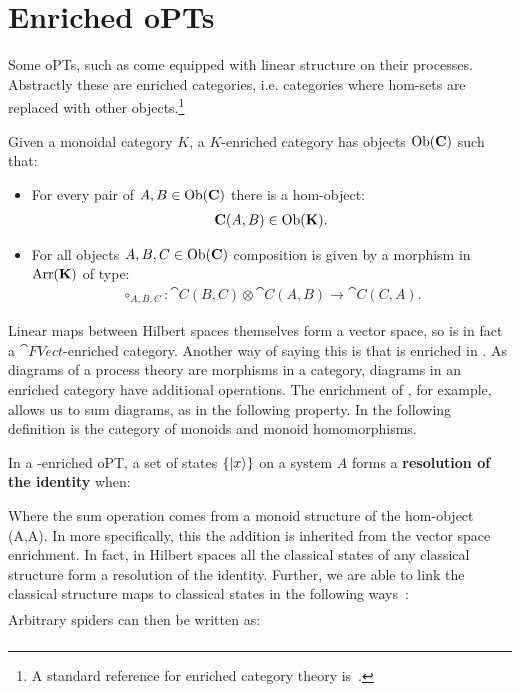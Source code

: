 \section{Enriched oPTs}
\label{sec:enrichedoPTs}
Some oPTs, such as  come equipped with linear structure on their processes. Abstractly these are enriched categories, i.e. categories where hom-sets are replaced with other objects.\footnote{A standard reference for enriched category theory is~\cite{kelly1982basic}.}

\begin{defn}
\label{def:enrichedcat}
Given a monoidal category $K$, a $K$-enriched category  has objects $\mbox{Ob}(\mathbf{C})$ such that:
\begin{itemize}
\item For every pair of $A,B\in\mbox{Ob}(\mathbf{C})$ there is a hom-object:
\begin{align}
\mathbf{C}(A,B)\in \mbox{Ob}(\mathbf{K}).
\end{align}
\item For all objects $A,B,C\in\mbox{Ob}(\mathbf{C})$ composition is given by a morphism in $\mbox{Arr}(\mathbf{K})$ of type:
\begin{align}
 \circ_{A,B,C}:\cat{C}(B,C)\otimes\cat{C}(A,B)\to\cat{C}(C,A).
\end{align}
\end{itemize}
\end{defn}

Linear maps between Hilbert spaces themselves form a vector space, so  is in fact a $\cat{FVect}$-enriched category. Another way of saying this is that  is enriched in . As diagrams of a process theory are morphisms in a category, diagrams in an enriched category have additional operations. The  enrichment of , for example, allows us to sum diagrams, as in the following property. In the following definition  is the category of monoids and monoid homomorphisms.


\begin{defn}
\label{def:resid}
In a -enriched oPT, a set of states $\{| x \rangle\}$ on a system $A$ forms a \textbf{resolution of the identity} when:
\begin{equation}
\label{eq:ResolutionId}

\end{equation}
\end{defn}

\noindent Where the sum operation comes from a monoid structure of the hom-object (A,A). In  more specifically, this the addition is inherited  from the vector space enrichment. In fact, in Hilbert spaces all the classical states of any classical structure form a resolution of the identity. Further, we are able to link the classical structure maps to classical states in the following ways~\cite{coecke2015generalised}:
\begin{align}
\label{eq:spidersums}

\end{align}
Arbitrary spiders can then be written as:
\begin{align}

\end{align}


